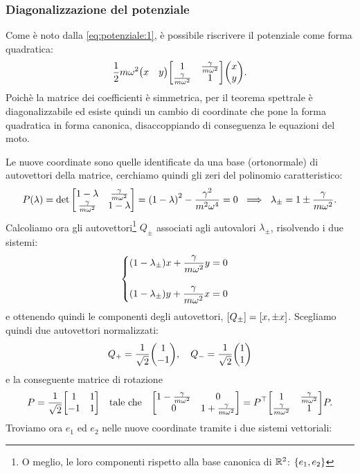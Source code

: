        \subsubsection{Diagonalizzazione del potenziale}
            Come \`e noto dalla \eqref{eq:potenziale:1}, \`e possibile riscrivere il potenziale come forma quadratica: $$\frac{1}{2}m\omega^2\mqty(x&y)\mqty[1 & \frac{\gamma}{m\omega^2} \\ \frac{\gamma}{m\omega^2} & 1]\mqty(x\\y).$$ Poich\`e la matrice dei coefficienti \`e simmetrica, per il teorema spettrale \`e diagonalizzabile ed esiste quindi un cambio di coordinate che pone la forma quadratica in forma canonica, disaccoppiando di conseguenza le equazioni del moto. \par Le nuove coordinate sono quelle identificate da una base (ortonormale) di autovettori della matrice, cerchiamo quindi gli zeri del polinomio caratteristico: $$P\qty(\lambda)=\det\mqty[1-\lambda & \frac{\gamma}{m\omega^2} \\ \frac{\gamma}{m\omega^2} & 1-\lambda]=\qty(1-\lambda)^2-\frac{\gamma^2}{m^2\omega^4}=0\ \implies\ \lambda_{\pm}=1\pm\frac{\gamma}{m\omega^2}.$$ Calcoliamo ora gli autovettori\footnote{O meglio, le loro componenti rispetto alla base canonica di $\mathbb{R}^2$: $\qty{e_1,e_2}$} $Q_{\pm}$ associati agli autovalori $\lambda_{\pm}$, risolvendo i due sistemi:
            \begin{equation*}
            \begin{cases}
                \displaystyle\qty(1-\lambda_{\pm})x+\frac{\gamma}{m\omega^2}y=0\\\\
                \displaystyle\qty(1-\lambda_{\pm})y+\frac{\gamma}{m\omega^2}x=0
            \end{cases}
            \end{equation*}
            e ottenendo quindi le componenti degli autovettori, $\qty[Q_{\pm}]=[x,\pm x]$. Scegliamo quindi due autovettori normalizzati: $$Q_{+}=\frac{1}{\sqrt{2}}\mqty(1 \\ -1),\quad Q_{-}=\frac{1}{\sqrt{2}}\mqty(1 \\ 1)$$ e la conseguente matrice di rotazione $$P=\frac{1}{\sqrt{2}}\mqty[1 & 1 \\ -1 & 1]\quad\text{tale che}\quad\mqty[1-\frac{\gamma}{m\omega^2} & 0 \\ 0 & 1+\frac{\gamma}{m\omega^2}]=P^\top\mqty[1 & \frac{\gamma}{m\omega^2} \\ \frac{\gamma}{m\omega^2} & 1]P.$$ Troviamo ora $e_1$ ed $e_2$ nelle nuove coordinate tramite i due sistemi vettoriali:
